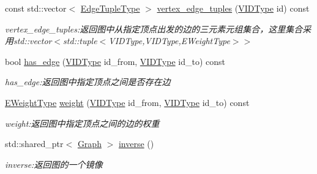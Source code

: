 \begin{DoxyCompactItemize}
const std\+::vector$<$ \hyperlink{struct_introduction_to_algorithm_1_1_graph_algorithm_1_1_graph_ad1eb485d135eb8076a44b00904ae2f5a}{Edge\+Tuple\+Type} $>$ \hyperlink{struct_introduction_to_algorithm_1_1_graph_algorithm_1_1_graph_a1a36b41adf54b242ff40610eae219eda}{vertex\+\_\+edge\+\_\+tuples} (\hyperlink{struct_introduction_to_algorithm_1_1_graph_algorithm_1_1_graph_a507632614d13e91d29acbf8acb0b0f0f}{V\+I\+D\+Type} id) const 
\begin{DoxyCompactList}\small\item\em vertex\+\_\+edge\+\_\+tuples\+:返回图中从指定顶点出发的边的三元素元组集合，这里集合采用{\ttfamily std\+::vector$<$std\+::tuple$<$V\+I\+D\+Type,V\+I\+D\+Type,E\+Weight\+Type$>$$>$} \end{DoxyCompactList}\item 
bool \hyperlink{struct_introduction_to_algorithm_1_1_graph_algorithm_1_1_graph_ac6f3559ac73a84a45285d2906b9f7557}{has\+\_\+edge} (\hyperlink{struct_introduction_to_algorithm_1_1_graph_algorithm_1_1_graph_a507632614d13e91d29acbf8acb0b0f0f}{V\+I\+D\+Type} id\+\_\+from, \hyperlink{struct_introduction_to_algorithm_1_1_graph_algorithm_1_1_graph_a507632614d13e91d29acbf8acb0b0f0f}{V\+I\+D\+Type} id\+\_\+to) const 
\begin{DoxyCompactList}\small\item\em has\+\_\+edge\+:返回图中指定顶点之间是否存在边 \end{DoxyCompactList}\item 
\hyperlink{struct_introduction_to_algorithm_1_1_graph_algorithm_1_1_graph_a77f6d3ef31203e0d6ebd2ed87928978a}{E\+Weight\+Type} \hyperlink{struct_introduction_to_algorithm_1_1_graph_algorithm_1_1_graph_a9736f238bdedf0d6fccc064e6acea65d}{weight} (\hyperlink{struct_introduction_to_algorithm_1_1_graph_algorithm_1_1_graph_a507632614d13e91d29acbf8acb0b0f0f}{V\+I\+D\+Type} id\+\_\+from, \hyperlink{struct_introduction_to_algorithm_1_1_graph_algorithm_1_1_graph_a507632614d13e91d29acbf8acb0b0f0f}{V\+I\+D\+Type} id\+\_\+to) const 
\begin{DoxyCompactList}\small\item\em weight\+:返回图中指定顶点之间的边的权重 \end{DoxyCompactList}\item 
std\+::shared\+\_\+ptr$<$ \hyperlink{struct_introduction_to_algorithm_1_1_graph_algorithm_1_1_graph}{Graph} $>$ \hyperlink{struct_introduction_to_algorithm_1_1_graph_algorithm_1_1_graph_aec06e55b6164700f65dcc08dafe79666}{inverse} ()
\begin{DoxyCompactList}\small\item\em inverse\+:返回图的一个镜像 \end{DoxyCompactList}\end{DoxyCompactItemize}
